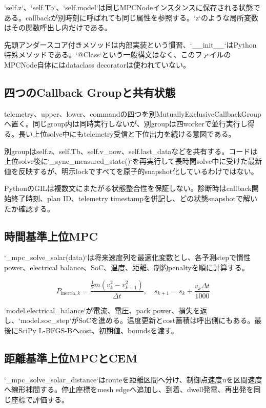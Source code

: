 \documentclass[a4paper,11pt]{article}
\begin{document}
`self.z`、`self.Tb`、`self.model`は同じMPCNodeインスタンスに保存される状態である。callbackが別時刻に呼ばれても同じ属性を参照する。`z`のような局所変数はその関数呼出し内だけである。


先頭アンダースコア付きメソッドは内部実装という慣習、`\_\_init\_\_`はPython特殊メソッドである。`@Class`という一般構文はなく、このファイルのMPCNode自体にはdataclass decoratorは使われていない。



\subsection{四つのCallback Groupと共有状態}
telemetry、upper、lower、commandの四つを別MutuallyExclusiveCallbackGroupへ置く。同じgroup内は同時実行しないが、別groupは四workerで並行実行し得る。長い上位solve中にもtelemetry受信と下位出力を続ける意図である。


別groupはself.z、self.Tb、self.v\_now、self.last\_dataなどを共有する。コードは上位solve後に`\_sync\_measured\_state()`を再実行して長時間solve中に受けた最新値を反映するが、明示lockですべてを原子的snapshot化しているわけではない。


PythonのGILは複数文にまたがる状態整合性を保証しない。診断時はcallback開始終了時刻、plan ID、telemetry timestampを併記し、どの状態snapshotで解いたか確認する。



\subsection{時間基準上位MPC}
`\_mpc\_solve\_solar(data)`は将来速度列を最適化変数とし、各予測stepで慣性power、electrical balance、SoC、温度、距離、制約penaltyを順に計算する。


\[
P_{\mathrm{inertia},k}=\frac{\frac12m(v_k^2-v_{k-1}^2)}{\Delta t},\quad s_{k+1}=s_k+\frac{v_k\Delta t}{1000}
\]

`model.electrical\_balance`が電流、電圧、pack power、損失を返し、`model.soc\_step`がSoCを進める。温度更新とcost蓄積は呼出側にもある。最後にSciPy L-BFGS-Bへcost、初期値、boundsを渡す。



\subsection{距離基準上位MPCとCEM}
`\_mpc\_solve\_solar\_distance`はrouteを距離区間へ分け、制御点速度uを区間速度へ線形補間する。停止座標をmesh edgeへ追加し、到着、dwell発電、再出発を同じ座標で評価する。
\end{document}
